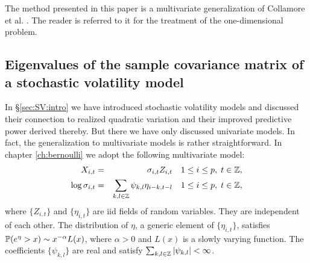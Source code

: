 The method presented in this paper is a multivariate generalization of
Collamore et al. \cite{collamore2014}. The reader is referred to it
for the treatment of the one-dimensional problem.


\subsection{Eigenvalues of the sample covariance matrix of a   
  stochastic volatility model}
In \S\ref{sec:SV:intro} we have introduced stochastic volatility
models and discussed their connection to realized quadratic
variation and their improved predictive power derived thereby. But
there we have only discussed univariate models. In fact, the
generalization to multivariate models is rather straightforward. In
chapter \ref{ch:bernoulli} we adopt the following multivariate model:
\begin{eqnarray*}
  X_{i,t} &=& \sigma_{i,t} Z_{i,t} \quad
  1 \leq i \leq p,\;
  t \in \integers, \\
  \log \sigma_{i, t}
  &=&
  \sum_{k,l \in \integers} \psi_{k,l} \eta_{i-k, t-l}\quad
  1 \leq i \leq p,\;
  t \in \integers,
\end{eqnarray*}
where $\{Z_{i,t}\}$ and $\{\eta_{i,t}\}$ are iid fields of random
variables. They are independent of each other. The distribution of
$\eta$, a generic element of $\{\eta_{i,t}\}$, satisfies
$\P(e^\eta > x) \sim x^{-\alpha} L(x)$,
where $\alpha > 0$ and $L(x)$ is a slowly varying function. The
coefficients $\{\psi_{k,l}\}$ are real and satisfy
$\sum_{k, l \in \integers} |\psi_{k,l}| < \infty$.

